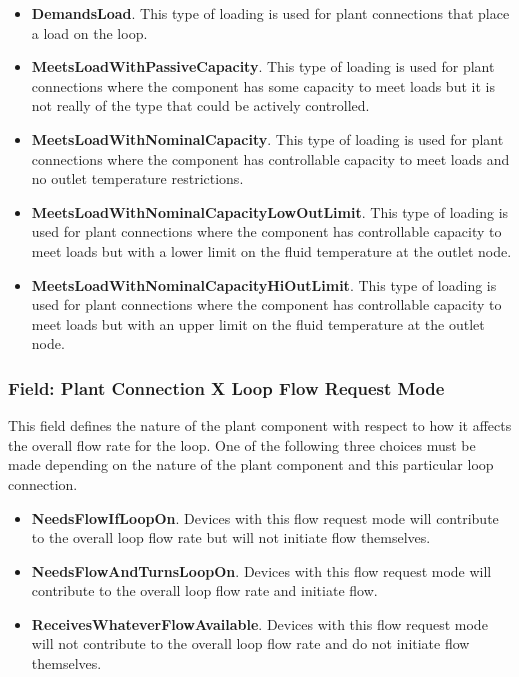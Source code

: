 \begin{itemize}
\item
  \textbf{DemandsLoad}. This type of loading is used for plant connections that place a load on the loop.
\item
  \textbf{MeetsLoadWithPassiveCapacity}. This type of loading is used for plant connections where the component has some capacity to meet loads but it is not really of the type that could be actively controlled.
\item
  \textbf{MeetsLoadWithNominalCapacity}. This type of loading is used for plant connections where the component has controllable capacity to meet loads and no outlet temperature restrictions.
\item
  \textbf{MeetsLoadWithNominalCapacityLowOutLimit}. This type of loading is used for plant connections where the component has controllable capacity to meet loads but with a lower limit on the fluid temperature at the outlet node.
\item
  \textbf{MeetsLoadWithNominalCapacityHiOutLimit}. This type of loading is used for plant connections where the component has controllable capacity to meet loads but with an upper limit on the fluid temperature at the outlet node.
\end{itemize}

\subsubsection{Field: Plant Connection X Loop Flow Request Mode}\label{field-plant-connection-x-loop-flow-request-mode}

This field defines the nature of the plant component with respect to how it affects the overall flow rate for the loop. One of the following three choices must be made depending on the nature of the plant component and this particular loop connection.

\begin{itemize}
\item
  \textbf{NeedsFlowIfLoopOn}. Devices with this flow request mode will contribute to the overall loop flow rate but will not initiate flow themselves.
\item
  \textbf{NeedsFlowAndTurnsLoopOn}. Devices with this flow request mode will contribute to the overall loop flow rate and initiate flow.
\item
  \textbf{ReceivesWhateverFlowAvailable}. Devices with this flow request mode will not contribute to the overall loop flow rate and do not initiate flow themselves.
\end{itemize}

